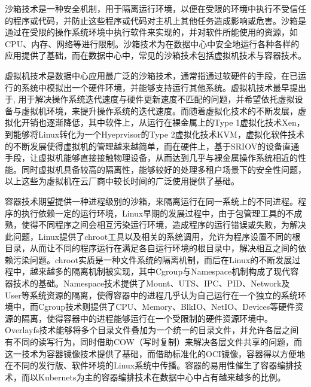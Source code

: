 
沙箱技术是一种安全机制，用于隔离运行环境，以便在受限的环境中执行不受信任的程序或代码，并防止这些程序或代码对主机上其他任务造成影响或危害。沙箱是通过在受限的操作系统环境中执行软件来实现的，并对软件所能使用的资源，如CPU、内存、网络等进行限制。沙箱技术为在数据中心中安全地运行各种各样的应用提供了基础，而在数据中心中，常见的沙箱技术包括虚拟机技术与容器技术。

虚拟机技术是数据中心应用最广泛的沙箱技术，通常指通过软硬件的手段，在已运行的系统中模拟出一个硬件环境，并能够支持运行其他系统。虚拟机技术最早提出于\citep{bugnion1997disco}, 用于解决操作系统迭代速度与硬件更新速度不匹配的问题，并希望依托虚拟设备与虚拟机环境，来提升操作系统的迭代速度。而随着虚拟化技术的不断发展，虚拟化开销也逐渐降低，其中软件上，从运行在裸金属上的Type 1虚拟化技术Xen\citep{barham2003xen}，到能够将Linux转化为一个Hyeprvisor的Type 2虚拟化技术KVM\citep{kivity2007kvm}，虚拟化软件技术的不断发展使得虚拟机的管理越来越简单，而在硬件上，基于SRIOV的设备直通手段\citep{dong2012high}，让虚拟机能够直接接触物理设备，从而达到几乎与裸金属操作系统相近的性能。同时虚拟机具备较高的隔离性，能够较好的处理多租户场景下的安全性问题，以上这些为虚拟机在云厂商中较长时间的广泛使用提供了基础。

容器技术期望提供一种进程级别的沙箱，来隔离运行在同一系统上的不同进程。程序的执行依赖一定的运行环境，Linux早期的发展过程中，由于包管理工具的不成熟，使得不同程序之间会相互污染运行环境，造成程序的运行错误或失败，为解决此问题，Linux提供了chroot工具以及相关的系统调用，允许为程序设置不同的根目录，从而让不同的程序运行在满足各自运行环境的根目录中，解决相互之间的依赖污染问题。chroot实质是一种文件系统的隔离机制，而后在Linux的不断发展过程中，越来越多的隔离机制被实现，其中Cgroup与Namespace机制构成了现代容器技术的基础。Namespace技术提供了Mount、UTS、IPC、PID、Network及User等系统资源的隔离，使得容器中的进程几乎认为自己运行在一个独立的系统环境中，而Cgroup技术则提供了CPU、Memory、BlkIO、NetIO、Devices等硬件资源的隔离，使得容器中的进程能够运行在一个受限制的硬件资源环境中。Overlayfs技术能够将多个目录文件叠加为一个统一的目录文件，并允许各层之间有不同的读写行为，同时借助COW（写时复制）来解决各层文件共享的问题，而这一技术为容器镜像技术提供了基础，而借助标准化的OCI镜像，容器得以方便地在不同的发行版、软件环境的Linux系统中传播。容器的易用性催生了容器编排技术，而以Kubernets为主的容器编排技术在数据中心中占有越来越多的比例。

